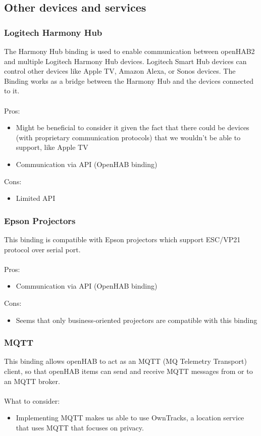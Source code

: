 \subsection{Other devices and services}

\subsubsection{Logitech Harmony  Hub}
The Harmony Hub binding is used to enable communication between openHAB2 and multiple Logitech Harmony Hub devices. Logitech Smart
Hub devices can control other devices like Apple TV, Amazon Alexa, or Sonos devices. The Binding works as a bridge between the Harmony
Hub and the devices connected to it.\\~\\
Pros:
\begin{itemize}
	\item Might be beneficial to consider it given the fact that there could be devices (with proprietary communication protocols) that
	we wouldn’t be able to support, like Apple TV
	\item Communication via API (OpenHAB binding)
\end{itemize}
Cons:
\begin{itemize}
	\item Limited API
\end{itemize}

\subsubsection{Epson Projectors}
This binding is compatible with Epson projectors which support ESC/VP21 protocol over serial port.\\~\\
Pros:
\begin{itemize}
	\item Communication via API (OpenHAB binding)
\end{itemize}
Cons:
\begin{itemize}
	\item Seems that only business-oriented projectors are compatible with this binding
\end{itemize}

\subsubsection{MQTT}
This binding allows openHAB to act as an MQTT (MQ Telemetry Transport) client, so that openHAB items can send and receive MQTT
messages from or to an MQTT broker.\\~\\
What to consider:
\begin{itemize}
	\item Implementing MQTT makes us able to use OwnTracks, a location service that uses MQTT that focuses on privacy.
\end{itemize}

